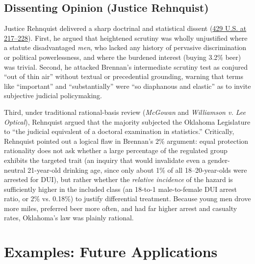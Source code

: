 \documentclass[12pt]{article}
\begin{document}
\subsection{Dissenting Opinion (Justice Rehnquist)}

Justice Rehnquist delivered a sharp doctrinal and statistical dissent (\href{https://supreme.justia.com/cases/federal/us/429/190/}{429 U.S. at 217--228}). First, he argued that heightened scrutiny was wholly unjustified where a statute disadvantaged \textit{men}, who lacked any history of pervasive discrimination or political powerlessness, and where the burdened interest (buying 3.2\% beer) was trivial. Second, he attacked Brennan's intermediate scrutiny test as conjured ``out of thin air'' without textual or precedential grounding, warning that terms like ``important'' and ``substantially'' were ``so diaphanous and elastic'' as to invite subjective judicial policymaking.

Third, under traditional rational-basis review (\textit{McGowan} and \textit{Williamson v. Lee Optical}), Rehnquist argued that the majority subjected the Oklahoma Legislature to ``the judicial equivalent of a doctoral examination in statistics.'' Critically, Rehnquist pointed out a logical flaw in Brennan's 2\% argument: equal protection rationality does not ask whether a large percentage of the regulated group exhibits the targeted trait (an inquiry that would invalidate even a gender-neutral 21-year-old drinking age, since only about 1\% of all 18--20-year-olds were arrested for DUI), but rather whether the \textit{relative incidence} of the hazard is sufficiently higher in the included class (an 18-to-1 male-to-female DUI arrest ratio, or 2\% vs. 0.18\%) to justify differential treatment. Because young men drove more miles, preferred beer more often, and had far higher arrest and casualty rates, Oklahoma's law was plainly rational.

\section{Examples: Future Applications}
\end{document}
